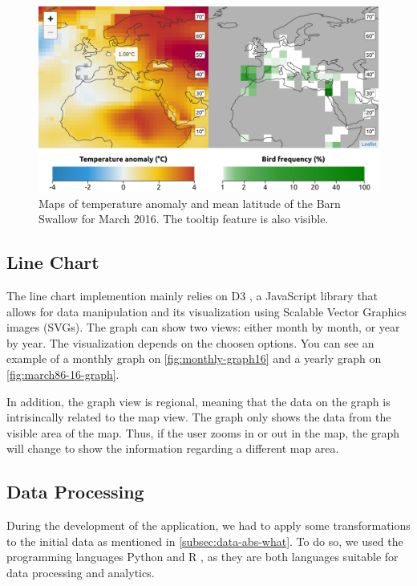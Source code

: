 \documentclass[journal]{vgtc}                %
\begin{document}
\begin{figure}[t]
  \centering
  \includegraphics[width=\linewidth]{map-example}
  \caption{Maps of temperature anomaly and mean latitude of the Barn Swallow for March 2016. The tooltip feature is also visible.}
  \label{fig:map-example}
\end{figure}

\subsection{Line Chart}

The line chart implemention mainly relies on D3 \cite{bostock2011d3}, a JavaScript library that allows for data manipulation and its visualization using Scalable Vector Graphics images (SVGs). The graph can show two views: either month by month, or year by year. The visualization depends on the choosen options. You can see an example of a monthly graph on \autoref{fig:monthly-graph16} and a yearly graph on \autoref{fig:march86-16-graph}.

In addition, the graph view is regional, meaning that the data on the graph is intrisincally related to the map view. The graph only shows the data from the visible area of the map. Thus, if the user zooms in or out in the map, the graph will change to show the information regarding a different map area.

\subsection{Data Processing}

During the development of the application, we had to apply some transformations to the initial data as mentioned in \autoref{subsec:data-abs-what}. To do so, we used the programming languages Python \cite{rossum1995python} and R \cite{rproject}, as they are both languages suitable for data processing and analytics.
\end{document}
